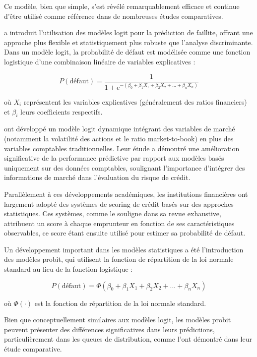 Ce modèle, bien que simple, s'est révélé remarquablement efficace et continue d'être utilisé comme référence dans de nombreuses études comparatives.

\citet{ohlson1980} a introduit l'utilisation des modèles logit pour la prédiction de faillite, offrant une approche plus flexible et statistiquement plus robuste que l'analyse discriminante. Dans un modèle logit, la probabilité de défaut est modélisée comme une fonction logistique d'une combinaison linéaire de variables explicatives :

\begin{equation}
P(\text{défaut}) = \frac{1}{1 + e^{-(\beta_0 + \beta_1X_1 + \beta_2X_2 + ... + \beta_nX_n)}}
\end{equation}

où $X_i$ représentent les variables explicatives (généralement des ratios financiers) et $\beta_i$ leurs coefficients respectifs.

\citet{campbell2008} ont développé un modèle logit dynamique intégrant des variables de marché (notamment la volatilité des actions et le ratio market-to-book) en plus des variables comptables traditionnelles. Leur étude a démontré une amélioration significative de la performance prédictive par rapport aux modèles basés uniquement sur des données comptables, soulignant l'importance d'intégrer des informations de marché dans l'évaluation du risque de crédit.

Parallèlement à ces développements académiques, les institutions financières ont largement adopté des systèmes de scoring de crédit basés sur des approches statistiques. Ces systèmes, comme le souligne \citet{thomas2000} dans sa revue exhaustive, attribuent un score à chaque emprunteur en fonction de ses caractéristiques observables, ce score étant ensuite utilisé pour estimer sa probabilité de défaut.

Un développement important dans les modèles statistiques a été l'introduction des modèles probit, qui utilisent la fonction de répartition de la loi normale standard au lieu de la fonction logistique :

\begin{equation}
P(\text{défaut}) = \Phi(\beta_0 + \beta_1X_1 + \beta_2X_2 + ... + \beta_nX_n)
\end{equation}

où $\Phi(\cdot)$ est la fonction de répartition de la loi normale standard.

Bien que conceptuellement similaires aux modèles logit, les modèles probit peuvent présenter des différences significatives dans leurs prédictions, particulièrement dans les queues de distribution, comme l'ont démontré \citet{zmijewski1984} dans leur étude comparative.

